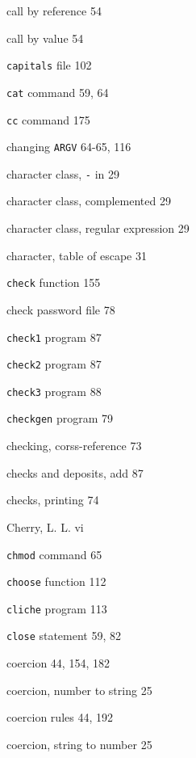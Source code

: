 \begin{multicols}{3}
\hangindent=4pc  call by reference 54

\hangindent=4pc  call by value 54

\hangindent=4pc  \verb'capitals' file 102

\hangindent=4pc  \verb'cat' command 59, 64

\hangindent=4pc  \verb'cc' command 175

\hangindent=4pc  changing \verb'ARGV' 64-65, 116

\hangindent=4pc  character class, \verb'-' in 29

\hangindent=4pc  character class, complemented 29

\hangindent=4pc  character class, regular expression 29

\hangindent=4pc  character, table of escape 31

\hangindent=4pc  \verb'check' function 155

\hangindent=4pc  check password file 78

\hangindent=4pc  \verb'check1' program 87

\hangindent=4pc  \verb'check2' program 87

\hangindent=4pc  \verb'check3' program 88

\hangindent=4pc  \verb'checkgen' program 79

\hangindent=4pc  checking, corss-reference 73

\hangindent=4pc  checks and deposits, add 87

\hangindent=4pc  checks, printing 74

\hangindent=4pc  Cherry, L. L. vi

\hangindent=4pc  \verb'chmod' command 65

\hangindent=4pc  \verb'choose' function 112

\hangindent=4pc  \verb'cliche' program 113

\hangindent=4pc  \verb'close' statement 59, 82

\hangindent=4pc  coercion 44, 154, 182

\hangindent=4pc  coercion, number to string 25

\hangindent=4pc  coercion rules 44, 192

\hangindent=4pc  coercion, string to number 25


\end{multicols}
